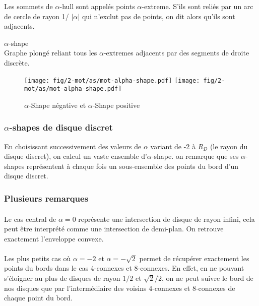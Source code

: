 Les sommets de $\alpha$-hull sont appelés points $\alpha$-extreme. S'ils sont reliés par un arc de cercle de rayon 1/ $\lvert \alpha \rvert$ qui n'exclut pas de points, on dit alors qu'ils sont adjacents.

\begin{Definition}{$\alpha$-shape}\\
\label{def:as}
      Graphe plongé reliant tous les $\alpha$-extremes adjacents par des segments de droite discrète.
\end{Definition}

\begin{figure}[h!]
  \centering
  \texttt{[image: fig/2-mot/as/mot-alpha-shape.pdf]}
  \texttt{[image: fig/2-mot/as/mot-alpha-shape.pdf]}
  \caption{$\alpha$-Shape négative et $\alpha$-Shape positive }
\end{figure}


\subsubsection{$\alpha$-shapes de disque discret}

En choisissant successivement des valeurs de $\alpha$ variant de -2 à $R_D$ (le rayon du disque discret), on calcul un vaste ensemble d'$\alpha$-shape. on remarque que ses $\alpha$-shapes représentent à chaque fois un sous-ensemble des points du bord d'un disque discret.


\subsubsection{Plusieurs remarques}

\paragraph{}
Le cas central de $\alpha = 0$ représente une intersection de disque de rayon infini, cela peut être interprété comme une intersection de demi-plan. On retrouve exactement l'enveloppe convexe.

\paragraph{}
Les plus petits cas où $\alpha = -2$ et $\alpha = -\sqrt{2}$ permet de récupérer exactement les points du bords dans le cas 4-connexes et 8-connexes. En effet, en ne pouvant s'éloigner au plus de disques de rayon $1/2$ et $\sqrt{2}/2$, on ne peut suivre le bord de nos disques que par l'intermédiaire des voisins 4-connexes et 8-connexes de chaque point du bord.

